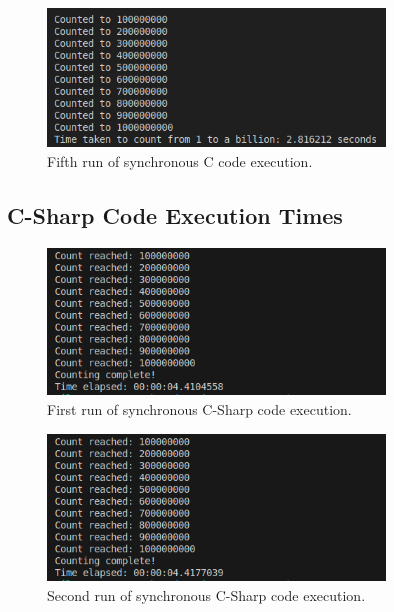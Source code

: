 \documentclass{article}
\begin{document}
\begin{figure}[htbp]
    \centering
    \includegraphics[width=0.8\textwidth]{../records/results_c/result_5.png}
    \caption{Fifth run of synchronous C code execution.}
    \label{fig:C-runtime-5}
\end{figure}

\clearpage
\subsection{C-Sharp Code Execution Times} 

\begin{figure}[htbp]
    \centering
    \includegraphics[width=0.8\textwidth]{../records/results_cs/result_1.png}
    \caption{First run of synchronous C-Sharp code execution.}
    \label{fig:C-Sharp-runtime-1}
\end{figure}

\begin{figure}[htbp]
    \centering
    \includegraphics[width=0.8\textwidth]{../records/results_cs/result_2.png}
    \caption{Second run of synchronous C-Sharp code execution.}
    \label{fig:C-Sharp-runtime-2}
\end{figure}
\end{document}
